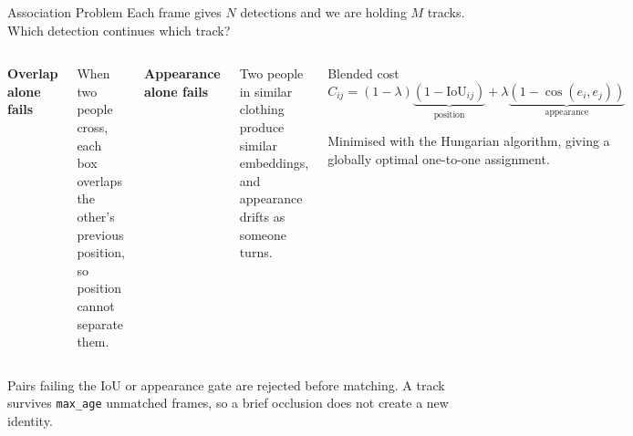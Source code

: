 \documentclass[aspectratio=169,11pt]{beamer}
\begin{document}
\begin{frame}{Association Problem}
  Each frame gives $N$ detections and we are holding $M$ tracks. Which detection
  continues which track?
  \vspace{0.9em}

  \begin{columns}[T,onlytextwidth]
      \textbf{Overlap alone fails}

      {\small When two people cross, each box overlaps the other's previous
      position, so position cannot separate them.}
      \vspace{0.6em}

      \textbf{Appearance alone fails}

      {\small Two people in similar clothing produce similar embeddings, and
      appearance drifts as someone turns.}
      \begin{block}{Blended cost}
        \vspace{-0.4em}
        \[
          C_{ij} = (1-\lambda)\underbrace{(1 - \mathrm{IoU}_{ij})}_{\text{position}}
                 + \lambda \underbrace{(1 - \cos(e_i, e_j))}_{\text{appearance}}
        \]
        \vspace{-0.5em}

        {\footnotesize Minimised with the Hungarian algorithm, giving a globally
        optimal one-to-one assignment.}
      \end{block}
  \end{columns}
  \vspace{0.6em}
  {\footnotesize Pairs failing the IoU or appearance gate are rejected before
  matching. A track survives \texttt{max\_age} unmatched frames, so a brief
  occlusion does not create a new identity.}
\end{frame}
\end{document}
